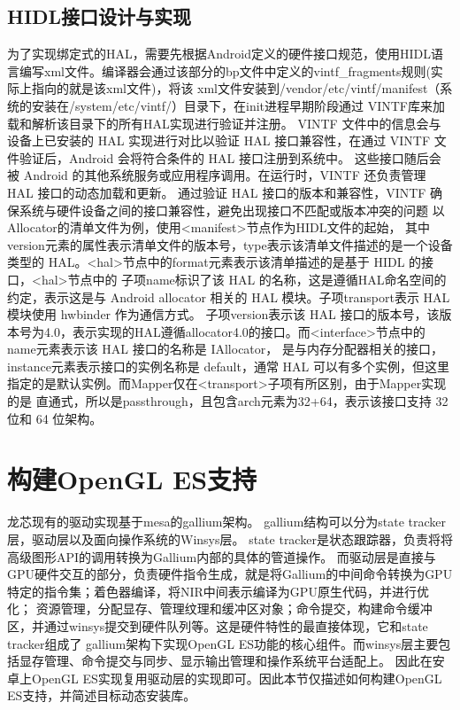 \subsection{HIDL接口设计与实现}
为了实现绑定式的HAL，需要先根据Android定义的硬件接口规范，使用HIDL语言编写xml文件。编译器会通过该部分的bp文件中定义的vintf\_fragments规则(实际上指向的就是该xml文件)，将该
xml文件安装到/vendor/etc/vintf/manifest（系统的安装在/system/etc/vintf/）目录下，在init进程早期阶段通过 VINTF库来加载和解析该目录下的所有HAL实现进行验证并注册。
VINTF 文件中的信息会与设备上已安装的 HAL 实现进行对比以验证 HAL 接口兼容性，在通过 VINTF 文件验证后，Android 会将符合条件的 HAL 接口注册到系统中。
这些接口随后会被 Android 的其他系统服务或应用程序调用。在运行时，VINTF 还负责管理 HAL 接口的动态加载和更新。
通过验证 HAL 接口的版本和兼容性，VINTF 确保系统与硬件设备之间的接口兼容性，避免出现接口不匹配或版本冲突的问题
以Allocator的清单文件为例，使用<manifest>节点作为HIDL文件的起始，
其中version元素的属性表示清单文件的版本号，type表示该清单文件描述的是一个设备类型的 HAL。<hal>节点中的format元素表示该清单描述的是基于 HIDL 的接口，<hal>节点中的
子项name标识了该 HAL 的名称，这是遵循HAL命名空间的约定，表示这是与 Android allocator 相关的 HAL 模块。子项transport表示 HAL 模块使用 hwbinder 作为通信方式。
子项version表示该 HAL 接口的版本号，该版本号为4.0，表示实现的HAL遵循allocator4.0的接口。而<interface>节点中的name元素表示该 HAL 接口的名称是 IAllocator，
是与内存分配器相关的接口，instance元素表示接口的实例名称是 default，通常 HAL 可以有多个实例，但这里指定的是默认实例。而Mapper仅在<transport>子项有所区别，由于Mapper实现的是
直通式，所以是passthrough，且包含arch元素为32+64，表示该接口支持 32 位和 64 位架构。

\section{构建OpenGL ES支持}

龙芯现有的驱动实现基于mesa的gallium架构。
gallium结构可以分为state tracker层，驱动层以及面向操作系统的Winsys层。
state tracker是状态跟踪器，负责将将高级图形API的调用转换为Gallium内部的具体的管道操作。
而驱动层是直接与GPU硬件交互的部分，负责硬件指令生成，就是将Gallium的中间命令转换为GPU特定的指令集；着色器编译，将NIR中间表示编译为GPU原生代码，并进行优化；
资源管理，分配显存、管理纹理和缓冲区对象；命令提交，构建命令缓冲区，并通过winsys提交到硬件队列等。这是硬件特性的最直接体现，它和state tracker组成了
gallium架构下实现OpenGL ES功能的核心组件。而winsys层主要包括显存管理、命令提交与同步、显示输出管理和操作系统平台适配上。
因此在安卓上OpenGL ES实现复用驱动层的实现即可。因此本节仅描述如何构建OpenGL ES支持，并简述目标动态安装库。

